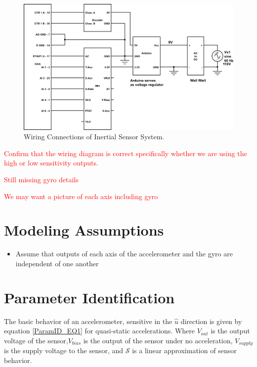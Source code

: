 \documentclass{article}
\newcommand{\xxx}[1]{\textcolor{red}{#1}}
\theoremstyle{plain}
\theoremstyle{definition}
\theoremstyle{remark}
\newcommand{\Sens}{\mathcal{S}}
\begin{document}
\begin{figure}[hbt]
\begin{center}
\includegraphics[width = 15cm]{WiringDiagram.png}
\caption{Wiring Connections of Inertial Sensor System.}
\label{wiring}
\end{center}
\end{figure}

\xxx{Confirm that the wiring diagram is correct specifically whether we are using the high or low sensitivity outputs.}

\xxx{Still missing gyro details}

\xxx{We may want a picture of each axis including gyro}

\clearpage

\section{Modeling Assumptions}
\begin{itemize}
\item{Assume that outputs of each axis of the accelerometer and the gyro are independent of one another}
\end{itemize}

\section{Parameter Identification}

The basic behavior of an accelerometer, sensitive in the $\hat{u}$ direction is given by equation \ref{ParamID_EQ1} for quasi-static accelerations.  Where $V_{out}$ is the output voltage of the sensor,$V_{bias}$ is the output of the sensor under no acceleration, $V_{supply}$ is the supply voltage to the sensor, and $\Sens$ is a linear approximation of sensor behavior.
\end{document}
